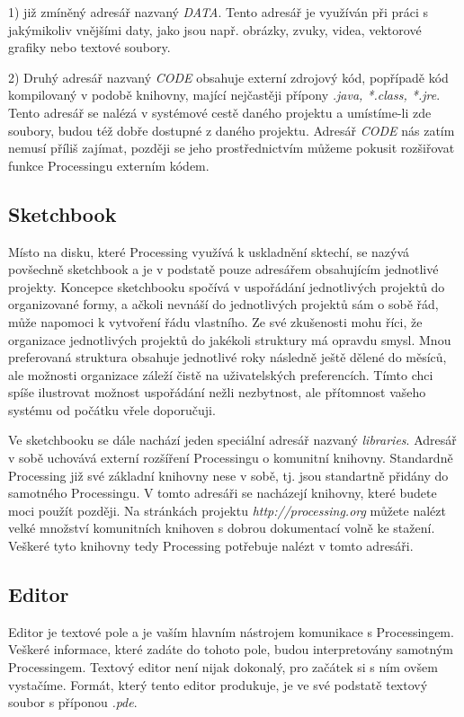 \documentclass[10pt]{book}
\newcommand{\pododdil}[1]{\subsection{#1}\index{#1}\label{#1}}
\begin{document}
1) již zmíněný adresář nazvaný {\em DATA}. Tento adresář je využíván při práci s jakýmikoliv vnějšími daty, jako jsou např. obrázky, zvuky, videa, vektorové grafiky nebo textové soubory.

2) Druhý adresář nazvaný {\em CODE} obsahuje externí zdrojový kód, popřípadě kód kompilovaný v podobě knihovny, mající nejčastěji přípony {\em *.java, *.class, *.jre}. Tento adresář se nalézá v systémové cestě daného projektu a umístíme-li zde soubory, budou též dobře dostupné z daného projektu. Adresář {\em CODE} nás zatím nemusí příliš zajímat, později se jeho prostřednictvím můžeme pokusit rozšiřovat funkce Processingu externím kódem.


\pododdil{Sketchbook}

Místo na disku, které Processing využívá k uskladnění sktechí, se nazývá povšechně sketchbook a je v podstatě pouze adresářem obsahujícím jednotlivé projekty. Koncepce sketchbooku spočívá v uspořádání jednotlivých projektů do organizované formy, a ačkoli nevnáší do jednotlivých projektů sám o sobě řád, může napomoci k vytvoření řádu vlastního. Ze své zkušenosti mohu říci, že organizace jednotlivých projektů do jakékoli struktury má opravdu smysl. Mnou preferovaná struktura obsahuje jednotlivé roky následně ještě dělené do měsíců, ale možnosti organizace záleží čistě na uživatelských preferencích. Tímto chci spíše ilustrovat možnost uspořádání nežli nezbytnost, ale přítomnost vašeho systému od počátku vřele doporučuji.

Ve sketchbooku se dále nachází jeden speciální adresář nazvaný {\em libraries}. Adresář v sobě uchovává externí rozšíření Processingu o komunitní knihovny. Standardně Processing již své základní knihovny nese v sobě, tj. jsou standartně přidány do samotného Processingu. V tomto adresáři se nacházejí knihovny, které budete moci použít později. Na stránkách projektu {\em http://processing.org} můžete nalézt velké množství komunitních knihoven s dobrou dokumentací volně ke stažení. Veškeré tyto knihovny tedy Processing potřebuje nalézt v tomto adresáři.






\pododdil{Editor}

Editor je textové pole a je vaším hlavním nástrojem komunikace s Processingem. Veškeré informace, které zadáte do tohoto pole, budou interpretovány samotným Processingem. Textový editor není nijak dokonalý, pro začátek si s ním ovšem vystačíme. Formát, který tento editor produkuje, je ve své podstatě textový soubor s příponou {\em *.pde}. 
\end{document}
